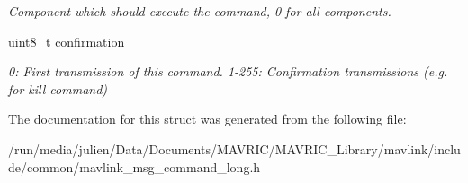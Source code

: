 \begin{DoxyCompactItemize}
\begin{DoxyCompactList}\small\item\em Component which should execute the command, 0 for all components. \end{DoxyCompactList}\item 
\hypertarget{struct____mavlink__command__long__t_a79ec42e9308bf4cc44c64ae939fe1d61}{uint8\+\_\+t \hyperlink{struct____mavlink__command__long__t_a79ec42e9308bf4cc44c64ae939fe1d61}{confirmation}}\label{struct____mavlink__command__long__t_a79ec42e9308bf4cc44c64ae939fe1d61}

\begin{DoxyCompactList}\small\item\em 0\+: First transmission of this command. 1-\/255\+: Confirmation transmissions (e.\+g. for kill command) \end{DoxyCompactList}\end{DoxyCompactItemize}


The documentation for this struct was generated from the following file\+:\begin{DoxyCompactItemize}
\item 
/run/media/julien/\+Data/\+Documents/\+M\+A\+V\+R\+I\+C/\+M\+A\+V\+R\+I\+C\+\_\+\+Library/mavlink/include/common/mavlink\+\_\+msg\+\_\+command\+\_\+long.\+h\end{DoxyCompactItemize}
